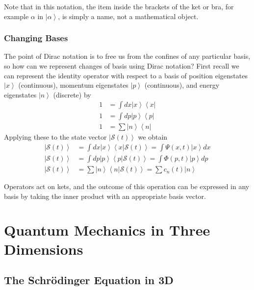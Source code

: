 \documentclass[12pt, a4paper, oneside, openright, titlepage]{book}
\newcommand{\bra}[1]{\left\langle#1\right\vert}
\newcommand{\ket}[1]{\left\vert#1\right\rangle}
\newcommand{\braket}[2]{\left\langle#1\right\vert\left.#2\right\rangle}
\begin{document}
Note that in this notation, the item inside the brackets of the ket or bra, for example $\alpha$ in $\ket{\alpha}$, is simply a name, not a mathematical object.

\subsection{Changing Bases}

The point of Dirac notation is to free us from the confines of any particular basis, so how can we represent changes of basis using Dirac notation? First recall we can represent the identity operator with respect to a basis of position eigenstates $\ket{x}$ (continuous), momentum eigenstates $\ket{p}$ (continuous), and energy eigenstates $\ket{n}$ (discrete) by \begin{align*}
    1 &= \int dx\ket{x}\bra{x} \\
    1 &= \int dp \ket{p}\bra{p} \\
    1 &= \sum\ket{n}\bra{n}
\end{align*}
Applying these to the state vector $\ket{\mathcal{S}(t)}$ we obtain \begin{align*}
    \ket{\mathcal{S}(t)} &= \int dx\ket{x}\braket{x}{\mathcal{S}(t)} = \int \Psi(x,t)\ket{x}dx \\
    \ket{\mathcal{S}(t)} &= \int dp \ket{p}\braket{p}{\mathcal{S}(t)} = \int \Phi(p,t)\ket{p}dp \\
    \ket{\mathcal{S}(t)} &= \sum\ket{n}\braket{n}{\mathcal{S}(t)} = \sum c_n(t)\ket{n}
\end{align*}

Operators act on kets, and the outcome of this operation can be expressed in any basis by taking the inner product with an appropriate basis vector. 



\chapter{Quantum Mechanics in Three Dimensions}

\section{The Schr\"{o}dinger Equation in 3D}
\end{document}

